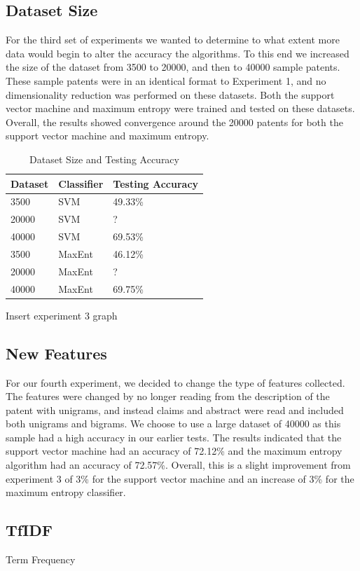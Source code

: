 \subsection{Dataset Size}
For the third set of experiments we wanted to determine to what extent more data would begin to alter the accuracy the algorithms.  To this end we increased the size of the dataset from 3500 to 20000, and then to 40000 sample patents.  These sample patents were in an identical format to Experiment 1, and no dimensionality reduction was performed on these datasets.  Both the support vector machine and maximum entropy were trained and tested on these datasets.  Overall, the results showed convergence around the 20000 patents for both the support vector machine and maximum entropy.


\begin{table}[Ht]
\caption{Dataset Size and Testing Accuracy}
\centering
\begin{tabular}{| l | l | l |}
\hline
Dataset & Classifier & Testing Accuracy \\ \hline
3500 & SVM & 49.33\% \\ \hline
20000 & SVM & ? \\ \hline
40000 & SVM & 69.53\% \\ \hline
3500 & MaxEnt & 46.12\% \\ \hline
20000 & MaxEnt & ? \\ \hline
40000 & MaxEnt & 69.75\% \\ \hline
\end{tabular}
\end{table}


Insert experiment 3 graph



\subsection{New Features}
For our fourth experiment, we decided to change the type of features collected.  The features were changed by no longer reading from the description of the patent with unigrams, and instead claims and abstract were read and included both unigrams and bigrams. We choose to use a large dataset of 40000 as this sample had a high accuracy in our earlier tests.  The results indicated that the support vector machine had an accuracy of 72.12\% and the maximum entropy algorithm had an accuracy of 72.57\%.  Overall, this is a slight improvement from experiment 3 of 3\% for the support vector machine and an increase of 3\% for the maximum entropy classifier.

\subsection{TfIDF}
Term Frequency
